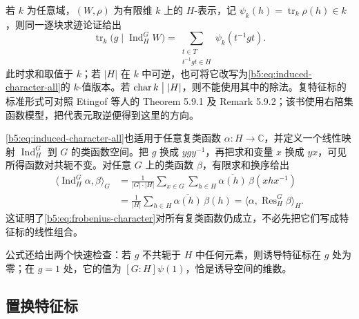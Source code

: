 \ProseParagraphBreak
若 \(k\) 为任意域，\((W,\rho)\) 为有限维 \(k\) 上的 \(H\)-表示，记 \(\psi_k(h)=\operatorname{tr}_k\rho(h)\in k\)，则同一逐块求迹论证给出
\[
	\operatorname{tr}_k\bigl(g\mid\operatorname{Ind}_H^G W\bigr) =\sum_{\substack{t\in T\\t^{-1}gt\in H}}\psi_k(t^{-1}gt).
\]
此时求和取值于 \(k\)；若 \(|H|\) 在 \(k\) 中可逆，也可将它改写为\eqref{b5:eq:induced-character-all}的 \(k\)-值版本。若 \(\operatorname{char}k\bigm\vert |H|\)，则不能使用其中的除法。复特征标的标准形式可对照 Etingof 等人的 Theorem 5.9.1 及 Remark 5.9.2\cite[Section 5.9, pp. 106--107]{EtingofEtAl2011RepresentationTheory}；该书使用右陪集函数模型，把代表元取逆便得到这里的方向。

\ProseParagraphBreak
\eqref{b5:eq:induced-character-all}也适用于任意复类函数 \(\alpha:H\rightarrow\mathbb C\)，并定义一个线性映射 \(\operatorname{Ind}_H^G\) 到 \(G\) 的类函数空间。把 \(g\) 换成 \(ygy^{-1}\)，再把求和变量 \(x\) 换成 \(yx\)，可见所得函数对共轭不变。对任意 \(G\) 上的类函数 \(\beta\)，有限求和换序给出
\begin{align*}
	\langle\operatorname{Ind}_H^G\alpha,\beta\rangle_G &=\frac1{|G|\cdot|H|}\sum_{x\in G}\sum_{h\in H} \overline{\alpha(h)}\,\beta(xhx^{-1})\\
	&=\frac1{|H|}\sum_{h\in H}\overline{\alpha(h)}\,\beta(h) =\langle\alpha,\operatorname{Res}_H^G\beta\rangle_H.
\end{align*}
这证明了\eqref{b5:eq:frobenius-character}对所有复类函数仍成立，不必先把它们写成特征标的线性组合。

\ProseParagraphBreak
公式还给出两个快速检查：若 \(g\) 不共轭于 \(H\) 中任何元素，则诱导特征标在 \(g\) 处为零；在 \(g=1\) 处，它的值为 \([G:H]\psi(1)\)，恰是诱导空间的维数。

\subsection{置换特征标}
\label{b5:subsec:0303:02}

